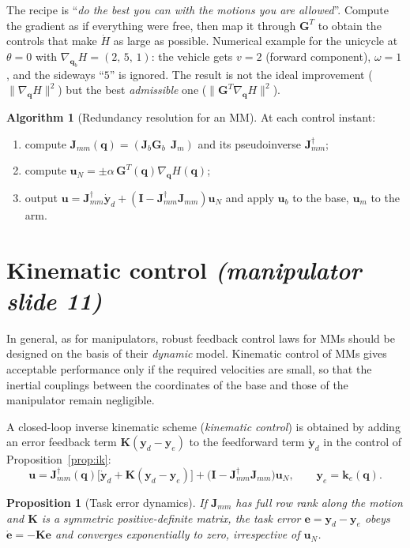 \documentclass[11pt,a4paper]{article}
\newcommand{\qbase}{\bm{q}_b}
\newcommand{\ubase}{\bm{u}_b}
\newcommand{\uarm}{\bm{u}_m}
\newcommand{\Gbase}{\bm{G}_b}
\newcommand{\Jbase}{\bm{J}_b}
\newcommand{\Jarm}{\bm{J}_m}
\newcommand{\Jmm}{\bm{J}_{mm}}
\newcommand{\ye}{\bm{y}_e}
\newcommand{\grad}{\nabla_{\!\bm{q}}}
\theoremstyle{plain}
\newtheorem{proposition}[theorem]{Proposition}
\theoremstyle{definition}
\newtheorem{algorithm}[theorem]{Algorithm}
\theoremstyle{remark}
\begin{document}
\begin{intuition}
The recipe is ``\emph{do the best you can with the motions you are allowed}''. Compute the gradient as if everything were free, then map it through $\bm G^T$ to obtain the controls that make $\dot H$ as large as possible. Numerical example for the unicycle at $\theta=0$ with $\nabla_{\qbase}H=(2,\,5,\,1)$: the vehicle gets $v=2$ (forward component), $\omega=1$, and the sideways ``$5$'' is ignored. The result is not the ideal improvement ($\|\grad H\|^2$) but the best \emph{admissible} one ($\|\bm G^T\grad H\|^2$).
\end{intuition}

\begin{algorithm}[Redundancy resolution for an MM]\label{alg:ik}
At each control instant:
\begin{enumerate}[leftmargin=*,nosep]
\item compute $\Jmm(\bm q)=(\Jbase\Gbase\ \ \Jarm)$ and its pseudoinverse $\Jmm^\dagger$;
\item compute $\bm u_N=\pm\alpha\,\bm G^T(\bm q)\grad H(\bm q)$;
\item output $\bm u=\Jmm^\dagger\dot{\bm y}_d+(\bm I-\Jmm^\dagger\Jmm)\bm u_N$ and apply $\ubase$ to the base, $\uarm$ to the arm.
\end{enumerate}
\end{algorithm}

\section{Kinematic control \emph{(manipulator slide 11)}}

In general, as for manipulators, robust feedback control laws for MMs should be designed on the basis of their \emph{dynamic} model. Kinematic control of MMs gives acceptable performance only if the required velocities are small, so that the inertial couplings between the coordinates of the base and those of the manipulator remain negligible.

A closed-loop inverse kinematic scheme (\emph{kinematic control}) is obtained by adding an error feedback term $\bm K(\bm y_d-\bm y_e)$ to the feedforward term $\dot{\bm y}_d$ in the control of Proposition~\ref{prop:ik}:
\[
\bm u=\Jmm^\dagger(\bm q)\bigl[\dot{\bm y}_d+\bm K(\bm y_d-\ye)\bigr]+\bigl(\bm I-\Jmm^\dagger\Jmm\bigr)\bm u_N ,\qquad \ye=\bm k_e(\bm q).
\]

\begin{proposition}[Task error dynamics]\label{prop:err}
If $\Jmm$ has full row rank along the motion and $\bm K$ is a symmetric positive-definite matrix, the task error $\bm e=\bm y_d-\ye$ obeys $\dot{\bm e}=-\bm K\bm e$ and converges exponentially to zero, irrespective of $\bm u_N$.
\end{proposition}
\end{document}
